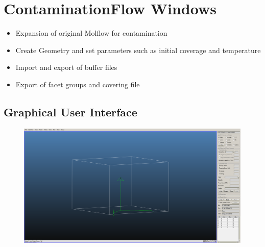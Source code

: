 
\chapter{ContaminationFlow Windows}\label{chapter:Windows}

\begin{itemize}[noitemsep,topsep=0pt]
\item Expansion of original Molflow for contamination
\item Create Geometry and set parameters such as initial coverage and temperature
\item Import and export of buffer files
\item Export of facet groups and covering file
\end{itemize}

\section{Graphical User Interface}
\begin{figure}[h]
\includegraphics[width=\linewidth]{figures/ContWin}
\end{figure}

